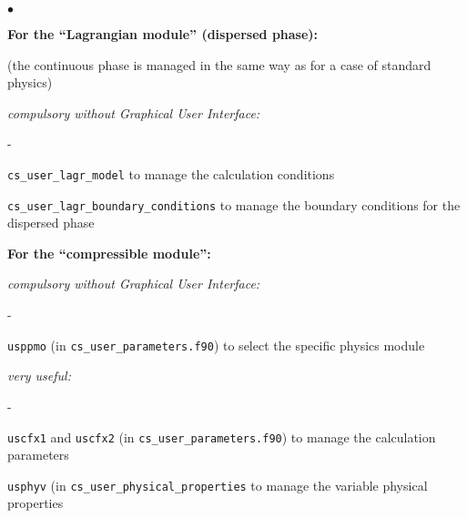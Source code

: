{{{{{\begin{list}{$\bullet$}{}
\begin{list}{}{}
    \item{\bf For the ``Lagrangian module'' (dispersed phase):}

(the continuous phase is managed in the same way as for a case of standard
physics)
    \begin{list}{}{}
        \item {\em compulsory without Graphical User Interface:}
        \begin{list}{-}{}
            \item \texttt{cs\_user\_lagr\_model} to manage the calculation conditions

            \item \texttt{cs\_user\_lagr\_boundary\_conditions} to manage the
              boundary conditions for the dispersed phase

        \end{list}

    \end{list}

   \item {\bf For the ``compressible module'':}

    \begin{list}{}{}
        \item {\em compulsory without Graphical User Interface:}
        \begin{list}{-}{}
            \item \texttt{usppmo} (in \texttt{cs\_user\_parameters.f90})
                  to select the specific physics module
        \end{list}
        \item {\em very useful:}
        \begin{list}{-}{}
            \item \texttt{uscfx1} and \texttt{uscfx2} (in \texttt{cs\_user\_parameters.f90})
                  to manage the calculation parameters


           \item \texttt{usphyv} (in \texttt{cs\_user\_physical\_properties}
                  to manage the variable physical properties

        \end{list}
    \end{list}

\end{list}



\end{list}}}}}}
